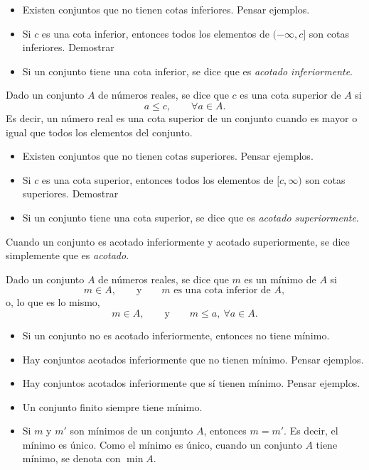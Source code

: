 \begin{itemize}
\item Existen conjuntos que no tienen cotas inferiores. Pensar ejemplos.
\item Si $c$ es una cota inferior, entonces todos los elementos de $(-\infty,c]$ son cotas inferiores. Demostrar
\item Si un conjunto tiene una cota inferior, se dice que es \emph{acotado inferiormente}.
\end{itemize}

\begin{definition}
Dado un conjunto $A$ de números reales, se dice que $c$ es una cota superior de $A$ si
\[
a \le c,\qquad \forall a\in A.
\]
Es decir, un número real es una cota superior de un conjunto cuando es mayor o igual que todos los elementos del conjunto.
\end{definition}

\begin{itemize}
    \item Existen conjuntos que no tienen cotas superiores. Pensar ejemplos.
    \item Si $c$ es una cota superior, entonces todos los elementos de $[c,\infty)$ son cotas superiores. Demostrar
    \item Si un conjunto tiene una cota superior, se dice que es \emph{acotado superiormente}.
\end{itemize}

Cuando un conjunto es acotado inferiormente y acotado superiormente, se dice simplemente que es \emph{acotado}.

\begin{definition}
    Dado un conjunto $A$ de números reales, se dice que $m$ es un mínimo de $A$ si
    \[ m\in A,\qquad \text{y} \qquad m\text{ es una cota inferior de $A$}, \]
    o, lo que es lo mismo,
    \[ m\in A,\qquad \text{y} \qquad m\le a,\ \forall a\in A. \]
\end{definition}

\begin{itemize}
    \item Si un conjunto no es acotado inferiormente, entonces no tiene mínimo.
    \item Hay conjuntos acotados inferiormente que no tienen mínimo. Pensar ejemplos.
    \item Hay conjuntos acotados inferiormente que sí tienen mínimo. Pensar ejemplos.
    \item Un conjunto finito siempre tiene mínimo.
    \item Si $m$ y $m'$ son mínimos de un conjunto $A$, entonces $m=m'$. Es decir, el mínimo es único.
    Como el mínimo es único, cuando un conjunto $A$ tiene mínimo, se denota con $\min A$.

\end{itemize}


